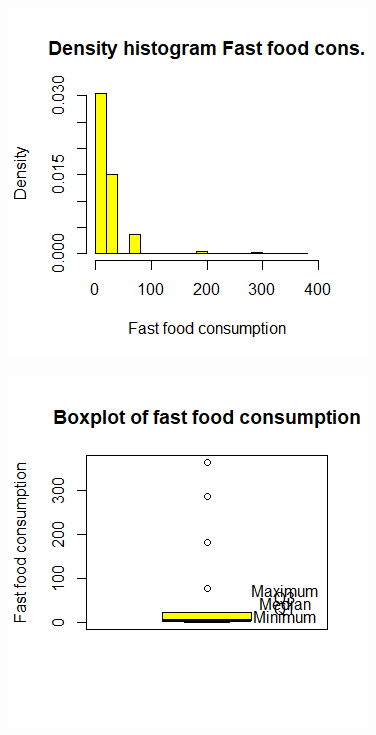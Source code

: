 \begin{figure}[ht!]
\centering
\begin{minipage}{.5\textwidth}
  \centering
  \includegraphics[width=1\linewidth]{root/Hist_fast.png}
  \label{HistFast}
\end{minipage}%
\begin{minipage}{.5\textwidth}
  \centering
  \includegraphics[width=1\linewidth]{root/Box_fast.png}
  \label{BoxFast}
\end{minipage}
\end{figure}
